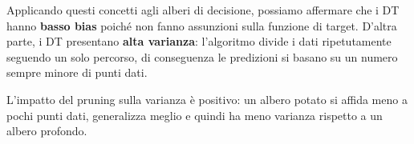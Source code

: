 Applicando questi concetti agli alberi di decisione,
possiamo affermare che i DT hanno \textbf{basso bias}
poiché non fanno assunzioni sulla funzione di target.
D'altra parte, i DT presentano \textbf{alta varianza}:
l'algoritmo divide i dati ripetutamente seguendo un solo
percorso, di conseguenza le predizioni si basano su un
numero sempre minore di punti dati.

L'impatto del pruning sulla varianza è positivo: un
albero potato si affida meno a pochi punti dati,
generalizza meglio e quindi ha meno varianza rispetto
a un albero profondo.

